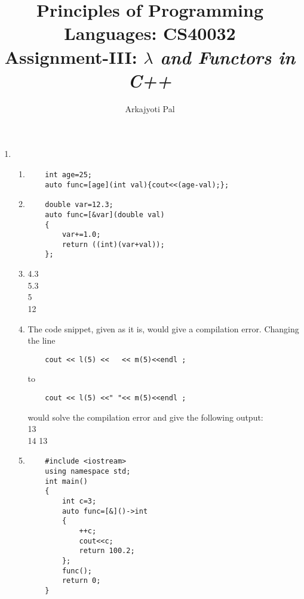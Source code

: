 \documentclass[11pt]{article}
\begin{document}
\author{Arkajyoti Pal}
\title{Principles of Programming Languages: CS40032 \\ Assignment-III: \textit{$\lambda$ and Functors in C++}}
\maketitle

\medskip


\begin{enumerate}
\item 
\begin{enumerate}
\item 
    \begin{lstlisting}
    int age=25;
    auto func=[age](int val){cout<<(age-val);};
    \end{lstlisting}
    
\item 
    \begin{lstlisting}
    double var=12.3;
    auto func=[&var](double val)
    {
        var+=1.0;
        return ((int)(var+val));
    };
    \end{lstlisting}
\item   4.3\\
    5.3\\
    5\\
    12
\item The code snippet, given as it is, would give a compilation error. Changing the line 
    \begin{lstlisting}
    cout << l(5) <<   << m(5)<<endl ;
    \end{lstlisting}
to     \begin{lstlisting}
    cout << l(5) <<" "<< m(5)<<endl ;
    \end{lstlisting}
would solve the compilation error and give the following output: \\
13\\
14 13

\item
\begin{lstlisting}
    #include <iostream>
    using namespace std;
    int main() 
    {
        int c=3;
        auto func=[&]()->int
        {   
            ++c; 
            cout<<c;
            return 100.2; 
        };
        func();
        return 0;
    }
\end{lstlisting}
    

\end{enumerate}
\end{enumerate}
\end{document}

